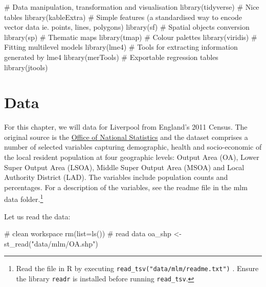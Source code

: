 \documentclass[
  letterpaper,
  DIV=11,
  numbers=noendperiod,
  oneside]{scrreprt}
\newenvironment{Shaded}{\begin{snugshade}}{\end{snugshade}}
\newcommand{\AttributeTok}[1]{\textcolor[rgb]{0.40,0.45,0.13}{#1}}
\newcommand{\CommentTok}[1]{\textcolor[rgb]{0.37,0.37,0.37}{#1}}
\newcommand{\FunctionTok}[1]{\textcolor[rgb]{0.28,0.35,0.67}{#1}}
\newcommand{\NormalTok}[1]{\textcolor[rgb]{0.00,0.23,0.31}{#1}}
\newcommand{\OtherTok}[1]{\textcolor[rgb]{0.00,0.23,0.31}{#1}}
\newcommand{\StringTok}[1]{\textcolor[rgb]{0.13,0.47,0.30}{#1}}
\begin{document}
\begin{Shaded}
\begin{Highlighting}[]
\CommentTok{\# Data manipulation, transformation and visualisation}
\FunctionTok{library}\NormalTok{(tidyverse)}
\CommentTok{\# Nice tables}
\FunctionTok{library}\NormalTok{(kableExtra)}
\CommentTok{\# Simple features (a standardised way to encode vector data ie. points, lines, polygons)}
\FunctionTok{library}\NormalTok{(sf) }
\CommentTok{\# Spatial objects conversion}
\FunctionTok{library}\NormalTok{(sp) }
\CommentTok{\# Thematic maps}
\FunctionTok{library}\NormalTok{(tmap) }
\CommentTok{\# Colour palettes}
\FunctionTok{library}\NormalTok{(viridis) }
\CommentTok{\# Fitting multilevel models}
\FunctionTok{library}\NormalTok{(lme4)}
\CommentTok{\# Tools for extracting information generated by lme4}
\FunctionTok{library}\NormalTok{(merTools)}
\CommentTok{\# Exportable regression tables}
\FunctionTok{library}\NormalTok{(jtools)}
\end{Highlighting}
\end{Shaded}

\section{Data}\label{data-4}

For this chapter, we will data for Liverpool from England's 2011 Census.
The original source is the
\href{https://www.nomisweb.co.uk/home/census2001.asp}{Office of National
Statistics} and the dataset comprises a number of selected variables
capturing demographic, health and socio-economic of the local resident
population at four geographic levels: Output Area (OA), Lower Super
Output Area (LSOA), Middle Super Output Area (MSOA) and Local Authority
District (LAD). The variables include population counts and percentages.
For a description of the variables, see the readme file in the mlm data
folder.\footnote{Read the file in R by executing
  \texttt{read\_tsv("data/mlm/readme.txt")} . Ensure the library
  \texttt{readr} is installed before running \texttt{read\_tsv}.}

Let us read the data:

\begin{Shaded}
\begin{Highlighting}[]
\CommentTok{\# clean workspace}
\FunctionTok{rm}\NormalTok{(}\AttributeTok{list=}\FunctionTok{ls}\NormalTok{())}
\CommentTok{\# read data}
\NormalTok{oa\_shp }\OtherTok{\textless{}{-}} \FunctionTok{st\_read}\NormalTok{(}\StringTok{"data/mlm/OA.shp"}\NormalTok{)}
\end{Highlighting}
\end{Shaded}
\end{document}

